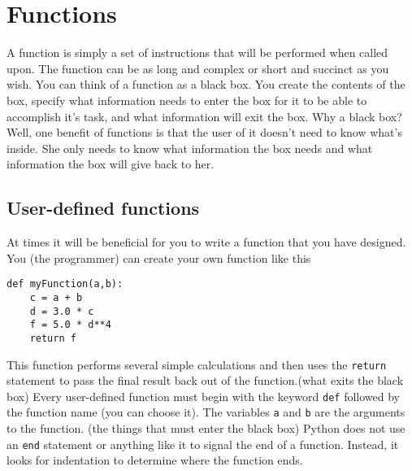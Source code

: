 
\section{Functions}
A function is simply a set of instructions that will be performed when
called upon.  The function can be as long and complex or short and
succinct as you wish.  You can think of a function as a black box. You
create the contents of the box, specify what information needs to
enter the box for it to be able to accomplish it's task, and what
information will exit the box.  Why a black box?  Well, one benefit of
functions is that the user of it doesn't need to know what's inside.
She only needs to know what information the box needs and what
information the box will give back to her.

\subsection*{User-defined functions}
At times it will be beneficial for you to write a function that you
have designed.  You (the programmer) can create your own function like
this
\begin{Verbatim}
def myFunction(a,b):
    c = a + b
    d = 3.0 * c
    f = 5.0 * d**4
    return f
\end{Verbatim}
This function performs several simple calculations and then uses the
\texttt{return} statement to pass the final result back out of the
function.(what exits the black box) Every user-defined function must
begin with the keyword \texttt{def} followed by the function name (you
can choose it). The variables \texttt{a} and \texttt{b} are the
arguments to the function. (the things that must enter the black box)
Python does not use an \texttt{end} statement or anything like it to
signal the end of a function.  Instead, it looks for indentation to
determine where the function ends.  

